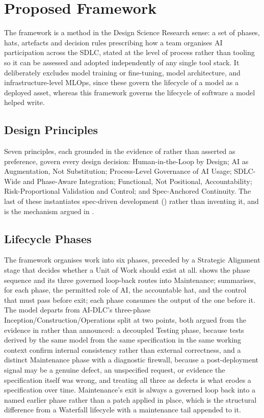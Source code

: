 \documentclass[sigconf,review=false]{acmart}
\begin{document}
\section{Proposed Framework}
\label{sec:framework}

The framework is a method in the Design Science Research sense: a set of phases, hats, artefacts and decision rules prescribing how a team organises AI participation across the SDLC, stated at the level of process rather than tooling so it can be assessed and adopted independently of any single tool stack. It deliberately excludes model training or fine-tuning, model architecture, and infrastructure-level MLOps, since these govern the lifecycle of a model as a deployed asset, whereas this framework governs the lifecycle of software a model helped write.

\subsection{Design Principles}
Seven principles, each grounded in the evidence of  rather than asserted as preference, govern every design decision: Human-in-the-Loop by Design; AI as Augmentation, Not Substitution; Process-Level Governance of AI Usage; SDLC-Wide and Phase-Aware Integration; Functional, Not Positional, Accountability; Risk-Proportional Validation and Control; and Spec-Anchored Continuity. The last of these instantiates spec-driven development () rather than inventing it, and is the mechanism argued in .

\subsection{Lifecycle Phases}
The framework organises work into six phases, preceded by a Strategic Alignment stage that decides whether a Unit of Work should exist at all.  shows the phase sequence and its three governed loop-back routes into Maintenance;  summarises, for each phase, the permitted role of AI, the accountable hat, and the control that must pass before exit; each phase consumes the output of the one before it. The model departs from AI-DLC's three-phase Inception/Construction/Operations split at two points, both argued from the evidence in  rather than announced: a decoupled Testing phase, because tests derived by the same model from the same specification in the same working context confirm internal consistency rather than external correctness, and a distinct Maintenance phase with a diagnostic firewall, because a post-deployment signal may be a genuine defect, an unspecified request, or evidence the specification itself was wrong, and treating all three as defects is what erodes a specification over time. Maintenance's exit is always a governed loop back into a named earlier phase rather than a patch applied in place, which is the structural difference from a Waterfall lifecycle with a maintenance tail appended to it.
\end{document}
